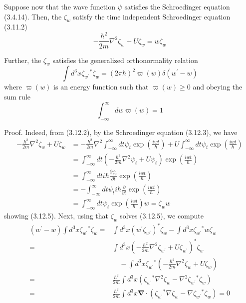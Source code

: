 \documentclass{article}
\begin{document}
Suppose now that the wave function $\psi$ satisfies the Schroedinger equation (3.4.14). Then, the $\zeta_{w}$ satisfy the time independent Schroedinger equation (3.11.2)
$$
\begin{equation*}
-\frac{\hbar^{2}}{2 m} \nabla^{2} \zeta_{w}+U \zeta_{w}=w \zeta_{w} \tag{3.12.5}
\end{equation*}
$$

Further, the $\zeta_{w}$ satisfies the generalized orthonormality relation
$$
\begin{equation*}
\int d^{3} x \zeta_{w^{\prime}}{ }^{*} \zeta_{w}=(2 \pi \hbar)^{2} \varpi(w) \delta\left(w^{\prime}-w\right) \tag{3.12.6}
\end{equation*}
$$
where $\varpi(w)$ is an energy function such that $\varpi(w) \geq 0$ and obeying the sum rule
$$
\begin{equation*}
\int_{-\infty}^{\infty} d w \varpi(w)=1 \tag{3.12.7}
\end{equation*}
$$

Proof. Indeed, from (3.12.2), by the Schroedinger equation (3.12.3), we have
$$
\begin{align*}
-\frac{\hbar^{2}}{2 m} \nabla^{2} \zeta_{w}+U \zeta_{w} & =-\frac{\hbar^{2}}{2 m} \nabla^{2} \int_{-\infty}^{\infty} d t \psi_{t} \exp \left(\frac{i w t}{\hbar}\right)+U \int_{-\infty}^{\infty} d t \psi_{t} \exp \left(\frac{i w t}{\hbar}\right) \\
& =\int_{-\infty}^{\infty} d t\left(-\frac{\hbar^{2}}{2 m} \nabla^{2} \psi_{t}+U \psi_{t}\right) \exp \left(\frac{i w t}{\hbar}\right)  \tag{3.12.8}\\
& =\int_{-\infty}^{\infty} d t i \hbar \frac{\partial \psi_{t}}{\partial t} \exp \left(\frac{i w t}{\hbar}\right) \\
& =-\int_{-\infty}^{\infty} d t \psi_{t} i \hbar \frac{\partial}{\partial t} \exp \left(\frac{i w t}{\hbar}\right) \\
& =\int_{-\infty}^{\infty} d t \psi_{t} \exp \left(\frac{i w t}{\hbar}\right) w=\zeta_{w} w
\end{align*}
$$
showing (3.12.5). Next, using that $\zeta_{w}$ solves (3.12.5), we compute
$$
\begin{align*}
\left(w^{\prime}-w\right) \int d^{3} x \zeta_{w^{\prime}}{ }^{*} \zeta_{w}= & \int d^{3} x\left(w^{\prime} \zeta_{w^{\prime}}\right)^{*} \zeta_{w}-\int d^{3} x \zeta_{w^{\prime}}{ }^{*} w \zeta_{w}  \tag{3.12.9}\\
= & \int d^{3} x\left(-\frac{\hbar^{2}}{2 m} \nabla^{2} \zeta_{w^{\prime}}+U \zeta_{w^{\prime}}\right)^{*} \zeta_{w} \\
& \quad-\int d^{3} x \zeta_{w^{\prime}}{ }^{*}\left(-\frac{\hbar^{2}}{2 m} \nabla^{2} \zeta_{w}+U \zeta_{w}\right) \\
= & \frac{\hbar^{2}}{2 m} \int d^{3} x\left(\zeta_{w^{\prime}}{ }^{*} \nabla^{2} \zeta_{w}-\nabla^{2} \zeta_{w^{\prime}}{ }^{*} \zeta_{w}\right) \\
= & \frac{\hbar^{2}}{2 m} \int d^{3} x \boldsymbol{\nabla} \cdot\left(\zeta_{w^{\prime}}{ }^{*} \nabla \zeta_{w}-\nabla \zeta_{w^{\prime}}{ }^{*} \zeta_{w}\right)=0
\end{align*}
$$
\end{document}
